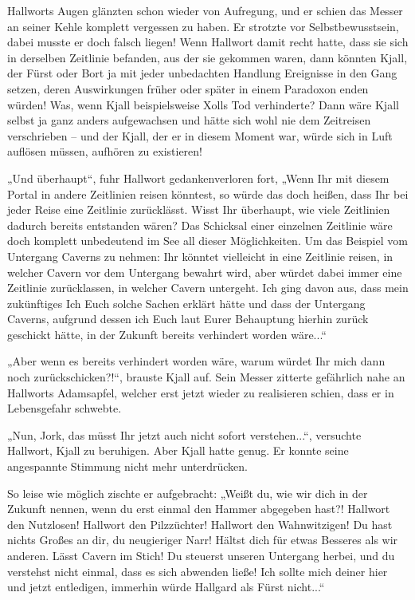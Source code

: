 Hallworts Augen glänzten schon wieder von Aufregung, und er schien das Messer an seiner Kehle komplett vergessen zu haben. Er strotzte vor Selbstbewusstsein, dabei musste er doch falsch liegen! Wenn Hallwort damit recht hatte, dass sie sich in derselben Zeitlinie befanden, aus der sie gekommen waren, dann könnten Kjall, der Fürst oder Bort ja mit jeder unbedachten Handlung Ereignisse in den Gang setzen, deren Auswirkungen früher oder später in einem Paradoxon enden würden! Was, wenn Kjall beispielsweise Xolls Tod verhinderte? Dann wäre Kjall selbst ja ganz anders aufgewachsen und hätte sich wohl nie dem Zeitreisen verschrieben – und der Kjall, der er in diesem Moment war, würde sich in Luft auflösen müssen, aufhören zu existieren!

„Und überhaupt“, fuhr Hallwort gedankenverloren fort, „Wenn Ihr mit diesem Portal in andere Zeitlinien reisen könntest, so würde das doch heißen, dass Ihr bei jeder Reise eine Zeitlinie zurücklässt. Wisst Ihr überhaupt, wie viele Zeitlinien dadurch bereits entstanden wären? Das Schicksal einer einzelnen Zeitlinie wäre doch komplett unbedeutend im See all dieser Möglichkeiten. Um das Beispiel vom Untergang Caverns zu nehmen: Ihr könntet vielleicht in eine Zeitlinie reisen, in welcher Cavern vor dem Untergang bewahrt wird, aber würdet dabei immer eine Zeitlinie zurücklassen, in welcher Cavern untergeht. Ich ging davon aus, dass mein zukünftiges Ich Euch solche Sachen erklärt hätte und dass der Untergang Caverns, aufgrund dessen ich Euch laut Eurer Behauptung hierhin zurück geschickt hätte, in der Zukunft bereits verhindert worden wäre...“

„Aber wenn es bereits verhindert worden wäre, warum würdet Ihr mich dann noch zurückschicken?!“, brauste Kjall auf. Sein Messer zitterte gefährlich nahe an Hallworts Adamsapfel, welcher erst jetzt wieder zu realisieren schien, dass er in Lebensgefahr schwebte.

„Nun, Jork, das müsst Ihr jetzt auch nicht sofort verstehen...“, versuchte Hallwort, Kjall zu beruhigen. Aber Kjall hatte genug. Er konnte seine angespannte Stimmung nicht mehr unterdrücken.

So leise wie möglich zischte er aufgebracht: „Weißt du, wie wir dich in der Zukunft nennen, wenn du erst einmal den Hammer abgegeben hast?! Hallwort den Nutzlosen! Hallwort den Pilzzüchter! Hallwort den Wahnwitzigen! Du hast nichts Großes an dir, du neugieriger Narr! Hältst dich für etwas Besseres als wir anderen. Lässt Cavern im Stich! Du steuerst unseren Untergang herbei, und du verstehst nicht einmal, dass es sich abwenden ließe! Ich sollte mich deiner hier und jetzt entledigen, immerhin würde Hallgard als Fürst nicht...“

